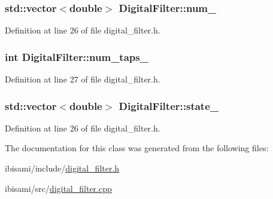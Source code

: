 \hypertarget{class_digital_filter_abf0263de2d7837bdc002615d3d7ca365}{}
\subsubsection[{num\+\_\+}]{\setlength{\rightskip}{0pt plus 5cm}std\+::vector$<$double$>$ Digital\+Filter\+::num\+\_\+\hspace{0.3cm}{\ttfamily [protected]}}\label{class_digital_filter_abf0263de2d7837bdc002615d3d7ca365}


Definition at line 26 of file digital\+\_\+filter.\+h.

\hypertarget{class_digital_filter_ad9099f4f1da3f23988591b9e733861d7}{}
\subsubsection[{num\+\_\+taps\+\_\+}]{\setlength{\rightskip}{0pt plus 5cm}int Digital\+Filter\+::num\+\_\+taps\+\_\+\hspace{0.3cm}{\ttfamily [protected]}}\label{class_digital_filter_ad9099f4f1da3f23988591b9e733861d7}


Definition at line 27 of file digital\+\_\+filter.\+h.

\hypertarget{class_digital_filter_a0fe7f91edef50acb1d8fb68957b71129}{}
\subsubsection[{state\+\_\+}]{\setlength{\rightskip}{0pt plus 5cm}std\+::vector$<$double$>$ Digital\+Filter\+::state\+\_\+\hspace{0.3cm}{\ttfamily [protected]}}\label{class_digital_filter_a0fe7f91edef50acb1d8fb68957b71129}


Definition at line 26 of file digital\+\_\+filter.\+h.



The documentation for this class was generated from the following files\+:\begin{DoxyCompactItemize}
\item 
ibisami/include/\hyperlink{digital__filter_8h}{digital\+\_\+filter.\+h}\item 
ibisami/src/\hyperlink{digital__filter_8cpp}{digital\+\_\+filter.\+cpp}\end{DoxyCompactItemize}
